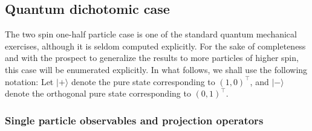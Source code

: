 \documentclass[%
  twocolumn,
 showpacs,
 showkeys,
 preprintnumbers,
 amsmath,amssymb,
 aps,
  pra,
  longbibliography,
 floatfix,
 ]{revtex4-1}
\begin{document}


\subsection{Quantum dichotomic case}

The two spin one-half particle case is one of the standard quantum mechanical exercises, although
it is seldom computed explicitly.
For the sake of completeness and with the prospect to generalize the results to more particles of higher spin,
this case will be enumerated explicitly.
In what follows, we shall use the following notation:
Let
$
\vert +\rangle
$
denote the pure state corresponding to
$\left(1,0\right)^\intercal
$,
and
$
\vert -\rangle $ denote the orthogonal pure state
corresponding to
$\left(0,1\right)^\intercal
$.



\subsubsection{Single particle observables and projection operators}
\end{document}
